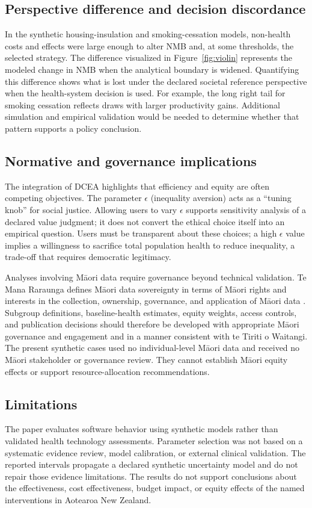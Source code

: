 \documentclass[article]{jss}
\begin{document}
\subsection{Perspective difference and decision discordance}
In the synthetic housing-insulation and smoking-cessation models, non-health costs and effects were large enough to alter NMB and, at some thresholds, the selected strategy.
The difference visualized in Figure~\ref{fig:violin} represents the modeled change in NMB when the analytical boundary is widened.
Quantifying this difference shows what is lost under the declared societal reference perspective when the health-system decision is used.
For example, the long right tail for smoking cessation reflects draws with larger productivity gains. Additional simulation and empirical validation would be needed to determine whether that pattern supports a policy conclusion.

\subsection{Normative and governance implications}
The integration of DCEA highlights that efficiency and equity are often competing objectives.
The parameter $\epsilon$ (inequality aversion) acts as a ``tuning knob'' for social justice.
Allowing users to vary $\epsilon$ supports sensitivity analysis of a declared value judgment; it does not convert the ethical choice itself into an empirical question.
Users must be transparent about these choices; a high $\epsilon$ value implies a willingness to sacrifice total population health to reduce inequality, a trade-off that requires democratic legitimacy.

Analyses involving M\={a}ori data require governance beyond technical validation.
Te Mana Raraunga defines M\={a}ori data sovereignty in terms of M\={a}ori rights and
interests in the collection, ownership, governance, and application of M\={a}ori
data \citep{temanararaunga2018}. Subgroup definitions, baseline-health
estimates, equity weights, access controls, and publication decisions should
therefore be developed with appropriate M\={a}ori governance and engagement and
in a manner consistent with te Tiriti o Waitangi. The present synthetic cases
used no individual-level M\={a}ori data and received no M\={a}ori stakeholder or
governance review. They cannot establish M\={a}ori equity effects or support
resource-allocation recommendations.

\subsection{Limitations}
The paper evaluates software behavior using synthetic models rather than
validated health technology assessments. Parameter selection was not based on
a systematic evidence review, model calibration, or external clinical
validation. The reported intervals propagate a declared synthetic uncertainty
model and do not repair those evidence limitations. The results do not
support conclusions about the effectiveness, cost effectiveness, budget
impact, or equity effects of the named interventions in Aotearoa New Zealand.
\end{document}
